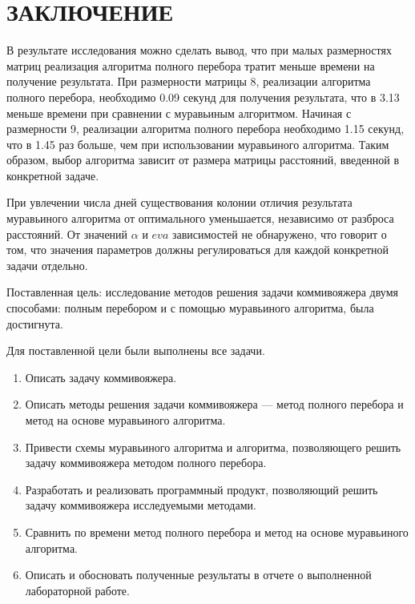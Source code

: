 \chapter*{\hfill{\centering  ЗАКЛЮЧЕНИЕ}\hfill}

В результате исследования можно сделать вывод, что при малых размерностях матриц реализация алгоритма полного перебора тратит меньше времени на получение результата.
При размерности матрицы 8, реализации алгоритма полного перебора, необходимо 0.09 секунд для получения результата, что в 3.13 меньше времени при сравнении с муравьиным алгоритмом.
Начиная с размерности 9, реализации алгоритма полного перебора необходимо 1.15 секунд, что в 1.45 раз больше, чем при использовании муравьиного алгоритма.
Таким образом, выбор алгоритма зависит от размера матрицы расстояний, введенной в конкретной задаче.

При увлечении числа дней существования колонии отличия результата муравьиного алгоритма от оптимального уменьшается, независимо от разброса расстояний. От значений $\alpha$ и $eva$ зависимостей не обнаружено, что говорит о том, что значения параметров должны регулироваться для каждой конкретной задачи отдельно. 

Поставленная цель: исследование методов решения задачи коммивояжера двумя способами: полным перебором и с помощью муравьиного алгоритма, была достигнута.

Для поставленной цели были выполнены все задачи.
\begin{enumerate}
	\item Описать задачу коммивояжера.
	\item Описать методы решения задачи коммивояжера --- метод полного перебора и метод на основе муравьиного алгоритма.
	\item Привести схемы муравьиного алгоритма и алгоритма, позволяющего решить задачу коммивояжера методом полного перебора.
	\item Разработать и реализовать программный продукт, позволяющий решить задачу коммивояжера исследуемыми методами.
	\item Сравнить по времени метод полного перебора и метод на основе муравьиного алгоритма.
	\item Описать и обосновать полученные результаты в отчете о выполненной лабораторной работе.
\end{enumerate}